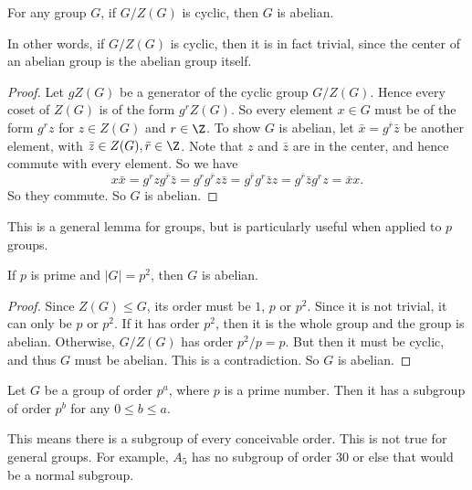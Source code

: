 \documentclass[a4paper]{article}
\begin{document}
\begin{lemma}
  For any group $G$, if $G/Z(G)$ is cyclic, then $G$ is abelian.

  In other words, if $G/Z(G)$ is cyclic, then it is in fact trivial, since the center of an abelian group is the abelian group itself.
\end{lemma}

\begin{proof}
  Let $gZ(G)$ be a generator of the cyclic group $G/Z(G)$. Hence every coset of $Z(G)$ is of the form $g^rZ(G)$. So every element $x \in G$ must be of the form $g^r z$ for $z \in Z(G)$ and $r \in \Z$. To show $G$ is abelian, let $\bar{x} = g^{\bar{r}} \bar{z}$ be another element, with $\bar{z} \in Z(G), \bar{r} \in \Z$. Note that $z$ and $\bar{z}$ are in the center, and hence commute with every element. So we have
  \[
    x\bar{x} = g^r z g^{\bar{r}} \bar{z} = g^r g^{\bar{r}} z \bar{z} = g^{\bar{r}}g^r \bar{z} z = g^{\bar{r}}\bar{z} g^r z = \bar{x} x.
  \]
  So they commute. So $G$ is abelian.
\end{proof}

This is a general lemma for groups, but is particularly useful when applied to $p$ groups.
\begin{cor}
  If $p$ is prime and $|G| = p^2$, then $G$ is abelian.
\end{cor}

\begin{proof}
  Since $Z(G) \leq G$, its order must be $1$, $p$ or $p^2$. Since it is not trivial, it can only be $p$ or $p^2$. If it has order $p^2$, then it is the whole group and the group is abelian. Otherwise, $G/Z(G)$ has order $p^2/p = p$. But then it must be cyclic, and thus $G$ must be abelian. This is a contradiction. So $G$ is abelian.
\end{proof}

\begin{thm}
  Let $G$ be a group of order $p^a$, where $p$ is a prime number. Then it has a subgroup of order $p^b$ for any $0 \leq b \leq a$.
\end{thm}
This means there is a subgroup of every conceivable order. This is not true for general groups. For example, $A_5$ has no subgroup of order $30$ or else that would be a normal subgroup.
\end{document}
